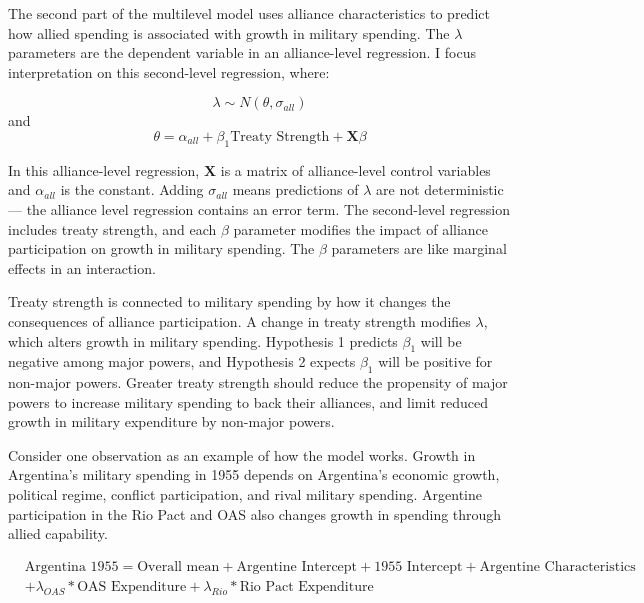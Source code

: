 \documentclass[12pt]{article}
\begin{document}
The second part of the multilevel model uses alliance characteristics to predict how allied spending is associated with growth in military spending. 
The $\lambda$ parameters are the dependent variable in an alliance-level regression.
I focus interpretation on this second-level regression, where: 

\begin{equation}
\lambda \sim N(\theta, \sigma_{all})
\end{equation} 
and 
\begin{equation}
\theta = \alpha_{all} + \beta_1 \mbox{Treaty Strength} + \textbf{X} \beta
\end{equation}

In this alliance-level regression, $\textbf{X}$ is a matrix of alliance-level control variables and $\alpha_{all}$ is the constant.
Adding $\sigma_{all}$ means predictions of $\lambda$ are not deterministic--- the alliance level regression contains an error term. 
The second-level regression includes treaty strength, and each $\beta$ parameter modifies the impact of alliance participation on growth in military spending. 
The $\beta$ parameters are like marginal effects in an interaction. 


Treaty strength is connected to military spending by how it changes the consequences of alliance participation. 
A change in treaty strength modifies $\lambda$, which alters growth in military spending.
Hypothesis 1 predicts $\beta_1$ will be negative among major powers, and Hypothesis 2 expects $\beta_1$ will be positive for non-major powers. 
Greater treaty strength should reduce the propensity of major powers to increase military spending to back their alliances, and limit reduced growth in military expenditure by non-major powers.  


Consider one observation as an example of how the model works. 
Growth in Argentina's military spending in 1955 depends on Argentina's economic growth, political regime, conflict participation, and rival military spending. 
Argentine participation in the Rio Pact and OAS also changes growth in spending through allied capability. 


\begin{equation}
\begin{split}
& \mbox{Argentina 1955} = \mbox{Overall mean}
+ \mbox{Argentine Intercept} + \mbox{1955 Intercept} 
+ \mbox{Argentine Characteristics} \\
& + \lambda_{OAS} * \mbox{OAS Expenditure} + \lambda_{Rio} * \mbox{Rio Pact Expenditure}
\end{split} 
\end{equation}
\end{document}
